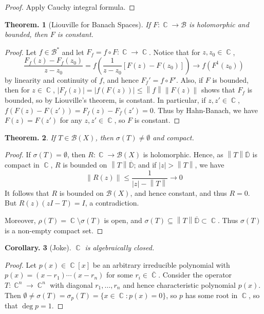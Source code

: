 \documentclass[11pt, a4paper]{memoir}
\DeclareMathOperator{\C}{{\mathbb{C}}}
\newcommand{\norm}[1]{\ensuremath{\left\lVert#1\right\rVert}}
\theoremstyle{change}
\newtheorem{theorem}{Theorem.}[section]
\newtheorem{corollary}[theorem]{Corollary.}
\theoremstyle{plain}
\theoremstyle{nonumberplain}
\newtheorem{proof}{Proof}
\numberwithin{equation}{section}
\begin{document}
\begin{proof}
    Apply Cauchy integral formula.
\end{proof}
\begin{theorem}[Liouville for Banach Spaces]
    If $F:\C\to\mathcal{B}$ is holomorphic and bounded, then $F$ is constant.
\end{theorem}
\begin{proof}
    Let $f\in\mathcal{B}^*$ and let $F_f=f\circ F:\C\to\C$.
    Notice that for $z,z_0\in\C$,
    \begin{equation*}
        \frac{F_f(z)-F_f(z_0)}{z-z_0}=f\left(\frac{1}{z-z_0}[F(z)-F(z_0)]\right)\to f(F^1(z_0))
    \end{equation*}
    by linearity and continuity of $f$, and hence $F_f'=f\circ F'$.
    Also, if $F$ is bounded, then for $z\in\C$, $|F_f(z)|=|f(F(z))|\leq\norm{f}\norm{F(z)}$ shows that $F_f$ is bounded, so by Liouville's theorem, is constant.
    In particular, if $z,z'\in\C$, $f(F(z)-F(z'))=F_f(z)-F_f(z')=0$.
    Thus by Hahn-Banach, we have $F(z)=F(z')$ for any $z,z'\in\C$, so $F$ is constant.
\end{proof}
\begin{theorem}
    If $T\in\mathcal{B}(X)$, then $\sigma(T)\neq\emptyset$ and compact.
\end{theorem}
\begin{proof}
    If $\sigma(T)=\emptyset$, then $R:\C\to\mathcal{B}(X)$ is holomorphic.
    Hence, as $\norm{T}\overline{\mathbb{D}}$ is compact in $\C$, $R$ is bounded on $\norm{T}\overline{\mathbb{D}}$; and if $|z|>\norm{T}$, we have
    \begin{equation*}
        \norm{R(z)}\leq\frac{1}{|z|-\norm{T}}\to 0
    \end{equation*}
    It follows that $R$ is bounded on $\mathcal{B}(X)$, and hence constant, and thus $R=0$.
    But $R(z)(zI-T)=I$, a contradiction.

    Moreover, $\rho(T)=\C\setminus\sigma(T)$ is open, and $\sigma(T)\subseteq\norm{T}\overline{\mathbb{D}}\subset\C$.
    Thus $\sigma(T)$ is a non-empty compact set.
\end{proof}
\begin{corollary}[Joke]
    $\C$ is algebraically closed.
\end{corollary}
\begin{proof}
    Let $p(x)\in\C[x]$ be an arbitrary irreducible polynomial with $p(x)=(x-r_1)\cdots(x-r_n)$ for some $r_i\in\overline{\C}$.
    Consider the operator $T:\C^n\to\C^n$ with diagonal $r_1,\ldots,r_n$ and hence characteristic polynomial $p(x)$.
    Then $\emptyset\neq\sigma(T)=\sigma_p(T)=\{x\in\C:p(x)=0\}$, so $p$ has some root in $\C$, so that $\deg p=1$.
\end{proof}
\end{document}
